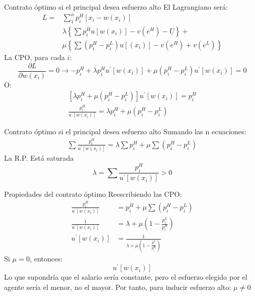 \begin{frame}{Contrato óptimo si el principal desea esfuerzo alto}
	El Lagrangiano será:
		\begin{align*}
			L = & \sum_{1}^{n}p_{i}^{H}\left[x_i - w\left( x_i\right) \right]\\
				& \lambda \left\lbrace \sum p_{i}^{H} u\left[ w\left( x_i\right) \right] - v\left( e^H \right) - \underline{U} \right\rbrace +\\
				& \mu \left\lbrace \sum\left( p_{i}^{H} - p_{i}^{L}\right) u\left[ \left(x_i \right) \right] - v\left( e^H\right) + v\left( e^L\right) \right\rbrace 
		\end{align*}
	La CPO, para cada $i$:
		$$\frac{\partial L}{\partial w\left( x_i\right)} = 0 \rightarrow - p_{i}^{H}+\lambda p_{i}^{H}u^\prime \left[ w\left( x_i\right) \right] + \mu \left( p_{i}^{H} - p_{i}^{L}\right)u^\prime\left[ w\left( x_i\right) \right] =0$$
	O:
		\begin{gather*}
			\left[ \lambda p_{i}^{H} + \mu \left(p_{i}^{H} - p_{i}^{L} \right) \right]u^\prime \left[ w\left( x_i\right) \right] = p_{i}^{H}\\
			\frac{p_{i}^{H}}{u^\prime \left[ w\left( x_i\right) \right]} = \lambda p_{i}^{H} + \mu \left(p_{i}^{H} - p_{i}^{L} \right)
		\end{gather*}
\end{frame}
\begin{frame}{Contrato óptimo si el principal desea esfuerzo alto}
	Sumando las n ecuaciones:
		\begin{gather*}
			\sum \frac{p_{i}^{H}}{u^\prime \left[ w\left( x_i\right) \right]} = \lambda \sum p_{i}^{H} + \mu \sum \left(p_{i}^{H} - p_{i}^{L} \right)
		\end{gather*}
	La R.P. Está saturada
		$$\lambda = \sum \frac{p_{i}^{H}}{u^\prime \left[ w\left( x_i\right) \right]} > 0$$
\end{frame}
\begin{frame}{Propiedades del contrato óptimo}
	Reescribiendo las CPO:
		\begin{align*}
			\frac{p_{i}^{H}}{u^\prime \left[ w\left( x_i\right) \right]} &= p_{i}^{H} + \mu \sum \left( p_{i}^{H} - p_{i}^{L} \right)\\[0.3cm]
			\frac{1}{u^\prime \left[ w\left( x_i\right) \right]} &= \lambda + \mu \left( 1 - \frac{p_{i}^{L}}{p_{i}^{H}}\right) \\[0.3cm]
			u^\prime \left[ w\left( x_i\right) \right] &= \frac{1}{\lambda + \mu \left( 1 - \frac{p_{i}^{L}}{p_{i}^{H}}\right)} 
		\end{align*}
	Si $\mu = 0$, entonces:
		$$u^\prime \left[ w\left( x_i\right) \right]$$
	Lo que supondría que el salario sería constante, pero el esfuerzo elegido por el agente sería el menor, no el mayor. Por tanto, para inducir esfuerzo alto: $\mu \neq 0$
\end{frame}
